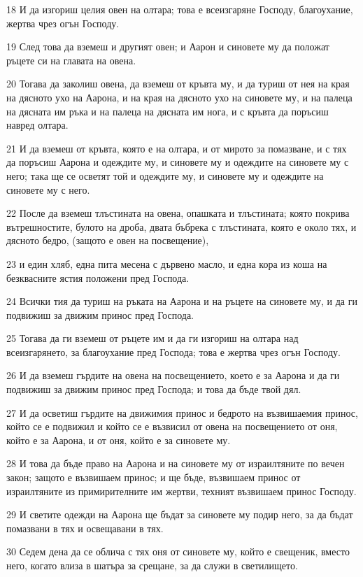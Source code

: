 \par 18 И да изгориш целия овен на олтара; това е всеизгаряне Господу, благоухание, жертва чрез огън Господу.
\par 19 След това да вземеш и другият овен; и Аарон и синовете му да положат ръцете си на главата на овена.
\par 20 Тогава да заколиш овена, да вземеш от кръвта му, и да туриш от нея на края на дясното ухо на Аарона, и на края на дясното ухо на синовете му, и на палеца на дясната им ръка и на палеца на дясната им нога, и с кръвта да поръсиш навред олтара.
\par 21 И да вземеш от кръвта, която е на олтара, и от мирото за помазване, и с тях да поръсиш Аарона и одеждите му, и синовете му и одеждите на синовете му с него; така ще се осветят той и одеждите му, и синовете му и одеждите на синовете му с него.
\par 22 После да вземеш тлъстината на овена, опашката и тлъстината; която покрива вътрешностите, булото на дроба, двата бъбрека с тлъстината, която е около тях, и дясното бедро, (защото е овен на посвещение),
\par 23 и един хляб, една пита месена с дървено масло, и една кора из коша на безквасните ястия положени пред Господа.
\par 24 Всички тия да туриш на ръката на Аарона и на ръцете на синовете му, и да ги подвижиш за движим принос пред Господа.
\par 25 Тогава да ги вземеш от ръцете им и да ги изгориш на олтара над всеизгарянето, за благоухание пред Господа; това е жертва чрез огън Господу.
\par 26 И да вземеш гърдите на овена на посвещението, което е за Аарона и да ги подвижиш за движим принос пред Господа; и това да бъде твой дял.
\par 27 И да осветиш гърдите на движимия принос и бедрото на възвишаемия принос, който се е подвижил и който се е възвисил от овена на посвещението от оня, който е за Аарона, и от оня, който е за синовете му.
\par 28 И това да бъде право на Аарона и на синовете му от израилтяните по вечен закон; защото е възвишаем принос; и ще бъде, възвишаем принос от израилтяните из примирителните им жертви, техният възвишаем принос Господу.
\par 29 И светите одежди на Аарона ще бъдат за синовете му подир него, за да бъдат помазвани в тях и освещавани в тях.
\par 30 Седем дена да се облича с тях оня от синовете му, който е свещеник, вместо него, когато влиза в шатъра за срещане, за да служи в светилището.
